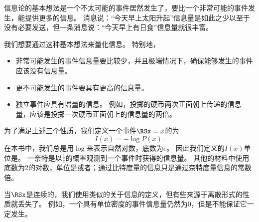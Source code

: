 信息论的基本想法是一个不太可能的事件居然发生了，要比一个非常可能的事件发生，能提供更多的信息。
消息说：``今天早上太阳升起''信息量是如此之少以至于没有必要发送，但一条消息说：``今天早上有日食''信息量就很丰富。


我们想要通过这种基本想法来量化信息。
特别地，
\begin{itemize}
\item 非常可能发生的事件信息量要比较少，并且极端情况下，确保能够发生的事件应该没有信息量。

\item 更不可能发生的事件要具有更高的信息量。

\item 独立事件应具有增量的信息。
例如，投掷的硬币两次正面朝上传递的信息量，应该是投掷一次硬币正面朝上的信息量的两倍。
\end{itemize}

为了满足上述三个性质，我们定义一个事件$\RSx = x$的为
\begin{equation}
I(x) = -\log P(x).
\end{equation}
在本书中，我们总是用$\log$来表示自然对数，底数为$e$。
因此我们定义的$I(x)$单位是。
一奈特是以$\frac{1}{e}$的概率观测到一个事件时获得的信息量。
其他的材料中使用底数为2的对数，单位是或者；通过比特度量的信息只是通过奈特度量信息的常数倍。

当$\RSx$是连续的，我们使用类似的关于信息的定义，但有些来源于离散形式的性质就丢失了。
例如，一个具有单位密度的事件信息量仍然为0，但是不能保证它一定发生。

